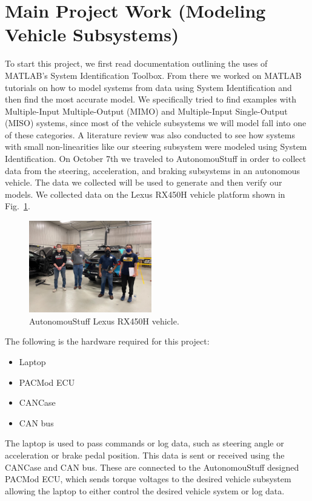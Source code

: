 \documentclass[journal,twoside,web]{ieeecolor}
\begin{document}
\section{Main Project Work (Modeling Vehicle Subsystems)}
To start this project, we first read documentation outlining the uses of MATLAB's System Identification Toolbox. From there we worked on MATLAB tutorials on how to model systems from data using System Identification and then find the most accurate model. We specifically tried to find examples with Multiple-Input Multiple-Output (MIMO) and Multiple-Input Single-Output (MISO) systems, since most of the vehicle subsystems we will model fall into one of these categories. A literature review was also conducted to see how systems with small non-linearities like our steering subsystem were modeled using System Identification. On October 7th we traveled to AutonomouStuff in order to collect data from the steering, acceleration, and braking subsystems in an autonomous vehicle. The data we collected will be used to generate and then verify our models. We collected data on the Lexus RX450H vehicle platform shown in Fig.~\ref{fig:lexusvehicle}. %
%
\begin{figure}[htbp]
	\centering
	\includegraphics[height=4cm]{figs/img/picturesVisitToAStuff/visitors1-20211007}
	\caption{AutonomouStuff Lexus RX450H vehicle.}
	\label{fig:lexusvehicle}
\end{figure}


\noindent The following is the hardware required for this project:  
	\begin{itemize}
    		\item Laptop
    		\item PACMod ECU
    		\item CANCase 
    		\item CAN bus 
 	\end{itemize}
 	
 	
	\noindent The laptop is used to pass commands or log data, such as steering angle or acceleration or brake pedal position. This data is sent or received using the CANCase and CAN bus. These are connected to the AutonomouStuff designed PACMod ECU, which sends torque voltages to the desired vehicle subsystem allowing the laptop to either control the desired vehicle system or log data.\bigskip
\end{document}
